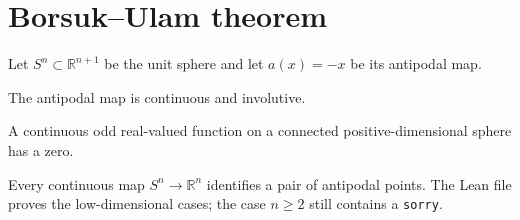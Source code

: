 \section{Borsuk--Ulam theorem}

\begin{definition}
\label{def:bu-antipode}
\leanok
Let $S^n\subset\mathbb R^{n+1}$ be the unit sphere and let $a(x)=-x$ be its antipodal map.
\end{definition}

\begin{lemma}
\label{lem:bu-antipode}
\leanok
{}
The antipodal map is continuous and involutive.
\end{lemma}

\begin{lemma}
\label{lem:bu-odd-zero}
\leanok
{}
A continuous odd real-valued function on a connected positive-dimensional sphere has a zero.
\end{lemma}

\begin{theorem}
\label{thm:borsuk-ulam}
\notready
{}
Every continuous map $S^n\to\mathbb R^n$ identifies a pair of antipodal points. The Lean file proves the low-dimensional cases; the case $n\ge2$ still contains a \texttt{sorry}.
\end{theorem}
